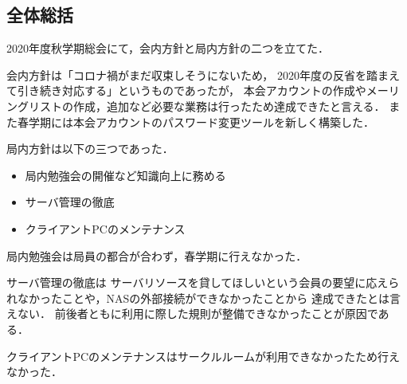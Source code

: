 \subsection*{全体総括}


2020年度秋学期総会にて，会内方針と局内方針の二つを立てた．

会内方針は「コロナ禍がまだ収束しそうにないため，
2020年度の反省を踏まえて引き続き対応する」というものであったが，
本会アカウントの作成やメーリングリストの作成，追加など必要な業務は行ったため達成できたと言える．
また春学期には本会アカウントのパスワード変更ツールを新しく構築した．

局内方針は以下の三つであった．
\begin{itemize}
  \item 局内勉強会の開催など知識向上に務める
  \item サーバ管理の徹底
  \item クライアントPCのメンテナンス
\end{itemize}
局内勉強会は局員の都合が合わず，春学期に行えなかった．

サーバ管理の徹底は
サーバリソースを貸してほしいという会員の要望に応えられなかったことや，NASの外部接続ができなかったことから
達成できたとは言えない．
前後者ともに利用に際した規則が整備できなかったことが原因である．

クライアントPCのメンテナンスはサークルルームが利用できなかったため行えなかった．
